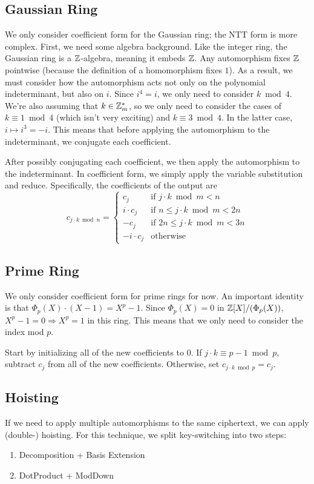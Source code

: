 \documentclass[../fheimpl.tex]{subfiles}
\begin{document}
\subsection{Gaussian Ring}
We only consider coefficient form for the Gaussian ring; the NTT form is more complex. First, we need some algebra background. Like the integer ring, the Gaussian ring is a $\mathbb{Z}$-algebra, meaning it embeds $\mathbb{Z}$. Any automorphism fixes $\mathbb{Z}$ pointwise (because the definition of a homomorphism fixes $1$). As a result, we must consider how the automorphism acts not only on the polynomial indeterminant, but also on $i$. Since $i^4=i$, we only need to consider $k\bmod 4$. We're also assuming that $k\in\mathbb{Z}_m^*$, so we only need to consider the cases of $k\equiv 1\bmod 4$ (which isn't very exciting) and $k\equiv 3\bmod 4$. In the latter case, $i\mapsto i^3=-i$. This means that before applying the automorphism to the indeterminant, we conjugate each coefficient.

After possibly conjugating each coefficient, we then apply the automorphism to the indeterminant. In coefficient form, we simply apply the variable substitution and reduce. Specifically, the coefficients of the output are
\[c_{j\cdot k\bmod n} = 
\begin{cases}
	c_j  & \text{if $j\cdot k\bmod m < n$}\\
	i\cdot c_j  & \text{if $n\le j\cdot k\bmod m < 2n$}\\
	-c_j  & \text{if $2n\le j\cdot k\bmod m < 3n$}\\
	-i\cdot c_j & \text{otherwise}
\end{cases}\] 

\subsection{Prime Ring}
We only consider coefficient form for prime rings for now. An important identity is that $\Phi_p(X)\cdot (X-1) = X^p-1$. Since $\Phi_p(X)=0$ in $\mathbb{Z}[X]/(\Phi_p(X))$, $X^p-1=0\Rightarrow X^p=1$ in this ring. This means that we only need to consider the index mod $p$.

Start by initializing all of the new coefficients to 0. If $j\cdot k\equiv p-1 \bmod p$, subtract $c_j$ from all of the new coefficients. Otherwise, set $c_{j\cdot k \bmod p} = c_j$.

\subsection{Hoisting}
If we need to apply multiple automorphisms to the same ciphertext, we can apply (double-) hoisting. For this technique, we split key-switching into two steps:
\begin{enumerate}
	\item Decomposition + Basis Extension
	\item DotProduct + ModDown
\end{enumerate}
\end{document}

